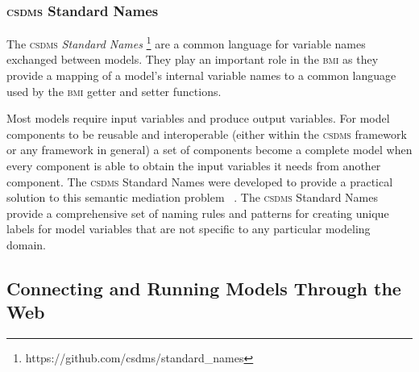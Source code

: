 \documentclass[11pt, oneside]{amsart}
\DeclareRobustCommand{\csdms}{\textsc{csdms}}
\DeclareRobustCommand{\bmi}{\textsc{bmi}}
\begin{document}
\subsubsection{\csdms{} Standard Names}
\label{sec:standardnames}

The \csdms{} \emph{Standard Names}
\footnote{https://github.com/csdms/standard\_names}
are a common language for variable names exchanged between models. They play
an important role in the \bmi{} as they provide a mapping of a model's
internal variable names to a common language used by the \bmi{} getter and
setter functions.

Most models require input variables and produce output variables. For model
components to be reusable and interoperable (either within the \csdms{}
framework or any framework in general)
a set of components become a complete model when every component is able to
obtain the input variables it needs from another component. The \csdms{}
Standard Names were developed to provide a practical solution to this
semantic mediation problem ~\cite{peckham2012component, syvitski2014plug}.
The \csdms{} Standard Names provide a comprehensive set of naming rules and
patterns for creating unique labels for model variables that are not specific
to any particular modeling domain.

\subsection{Connecting and Running Models Through the Web}
\label{sec:wmt}
\end{document}
